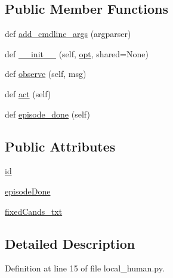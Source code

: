 \subsection*{Public Member Functions}
\begin{DoxyCompactItemize}
\item 
def \hyperlink{classparlai_1_1agents_1_1local__human_1_1local__human_1_1LocalHumanAgent_abc9993870cbd73a7706abef20021d6ca}{add\+\_\+cmdline\+\_\+args} (argparser)
\item 
def \hyperlink{classparlai_1_1agents_1_1local__human_1_1local__human_1_1LocalHumanAgent_ae6f3a4687b2a0c78d55f43bd89960fb0}{\+\_\+\+\_\+init\+\_\+\+\_\+} (self, \hyperlink{classparlai_1_1core_1_1agents_1_1Agent_ab3b45d2754244608c75d4068b90cd051}{opt}, shared=None)
\item 
def \hyperlink{classparlai_1_1agents_1_1local__human_1_1local__human_1_1LocalHumanAgent_aa204d28672d6580895d95aed167cb129}{observe} (self, msg)
\item 
def \hyperlink{classparlai_1_1agents_1_1local__human_1_1local__human_1_1LocalHumanAgent_a8959f66f1f70152c13552f99f5b10067}{act} (self)
\item 
def \hyperlink{classparlai_1_1agents_1_1local__human_1_1local__human_1_1LocalHumanAgent_a5c598c26dfd30db3120dac0cf02daf67}{episode\+\_\+done} (self)
\end{DoxyCompactItemize}
\subsection*{Public Attributes}
\begin{DoxyCompactItemize}
\item 
\hyperlink{classparlai_1_1agents_1_1local__human_1_1local__human_1_1LocalHumanAgent_a3b48630b9efada11b53cf37cbf269cce}{id}
\item 
\hyperlink{classparlai_1_1agents_1_1local__human_1_1local__human_1_1LocalHumanAgent_abbcf0b2948c89b6c42a10ef1c81457ce}{episode\+Done}
\item 
\hyperlink{classparlai_1_1agents_1_1local__human_1_1local__human_1_1LocalHumanAgent_a25f1a4e682f5cdbd61b211b1c9d5cf44}{fixed\+Cands\+\_\+txt}
\end{DoxyCompactItemize}


\subsection{Detailed Description}


Definition at line 15 of file local\+\_\+human.\+py.



